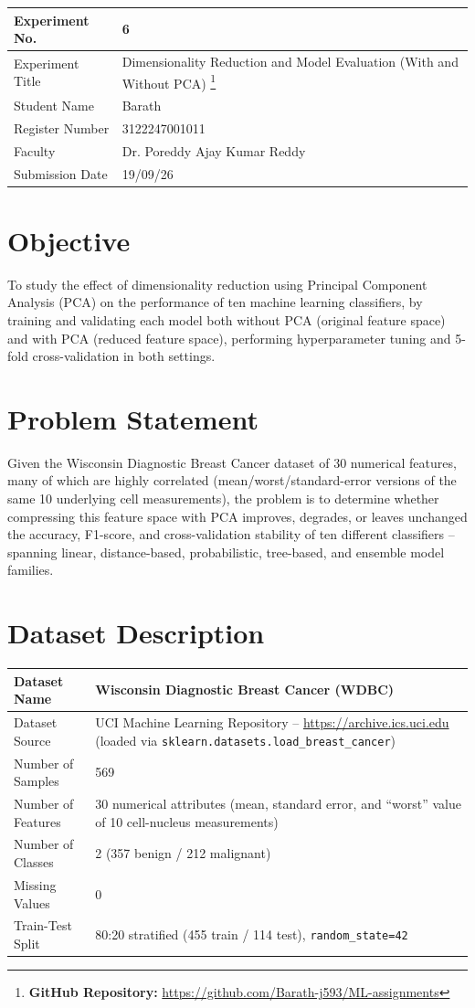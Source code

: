 \documentclass[12pt,a4paper]{article}
\begin{document}
\begin{tabular}{|p{4cm}|p{11cm}|}
\hline
Experiment No. & 6 \\ \hline
Experiment Title & Dimensionality Reduction and Model Evaluation (With and Without PCA)
\footnote{\textbf{GitHub Repository: }\url{https://github.com/Barath-j593/ML-assignments}}\\ \hline
Student Name & Barath \\ \hline
Register Number & 3122247001011 \\ \hline
Faculty & Dr. Poreddy Ajay Kumar Reddy \\ \hline
Submission Date & 19/09/26 \\ \hline
\end{tabular}

\section{Objective}
To study the effect of dimensionality reduction using Principal Component Analysis (PCA) on
the performance of ten machine learning classifiers, by training and validating each model
both without PCA (original feature space) and with PCA (reduced feature space), performing
hyperparameter tuning and 5-fold cross-validation in both settings.

\section{Problem Statement}
Given the Wisconsin Diagnostic Breast Cancer dataset of 30 numerical features, many of which
are highly correlated (mean/worst/standard-error versions of the same 10 underlying cell
measurements), the problem is to determine whether compressing this feature space with PCA
improves, degrades, or leaves unchanged the accuracy, F1-score, and cross-validation
stability of ten different classifiers -- spanning linear, distance-based, probabilistic,
tree-based, and ensemble model families.

\section{Dataset Description}
\begin{longtable}{|p{6cm}|p{8cm}|}
\hline
Dataset Name & Wisconsin Diagnostic Breast Cancer (WDBC) \\ \hline
Dataset Source & UCI Machine Learning Repository -- \url{https://archive.ics.uci.edu} (loaded via \texttt{sklearn.datasets.load\_breast\_cancer}) \\ \hline
Number of Samples & 569 \\ \hline
Number of Features & 30 numerical attributes (mean, standard error, and ``worst'' value of 10 cell-nucleus measurements) \\ \hline
Number of Classes & 2 (357 benign / 212 malignant) \\ \hline
Missing Values & 0 \\ \hline
Train-Test Split & 80:20 stratified (455 train / 114 test), \texttt{random\_state=42} \\ \hline
\end{longtable}
\end{document}
